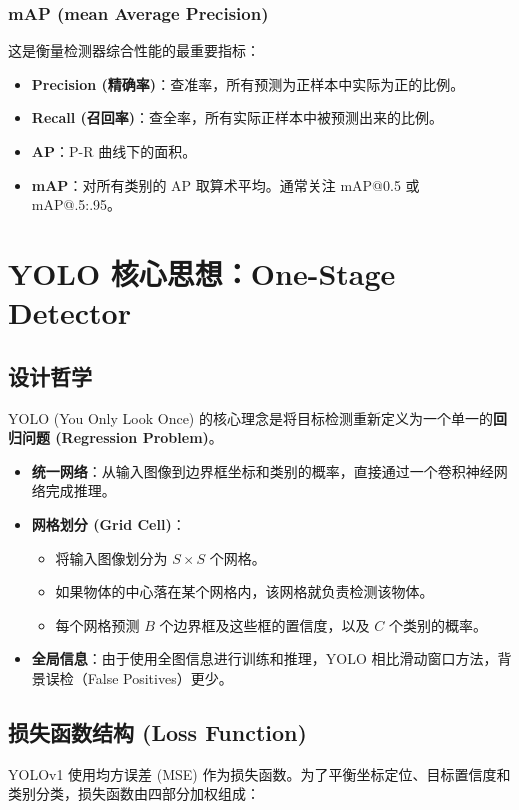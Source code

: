 \documentclass[11pt,a4paper]{article}
\begin{document}
\subsubsection{mAP (mean Average Precision)}
这是衡量检测器综合性能的最重要指标：
\begin{itemize}
    \item \textbf{Precision (精确率)}：查准率，所有预测为正样本中实际为正的比例。
    \item \textbf{Recall (召回率)}：查全率，所有实际正样本中被预测出来的比例。
    \item \textbf{AP}：P-R 曲线下的面积。
    \item \textbf{mAP}：对所有类别的 AP 取算术平均。通常关注 mAP@0.5 或 mAP@.5:.95。
\end{itemize}


\section{YOLO 核心思想：One-Stage Detector}

\subsection{设计哲学}
YOLO (You Only Look Once) 的核心理念是将目标检测重新定义为一个单一的\textbf{回归问题 (Regression Problem)}。
\begin{itemize}
    \item \textbf{统一网络}：从输入图像到边界框坐标和类别的概率，直接通过一个卷积神经网络完成推理。
    \item \textbf{网格划分 (Grid Cell)}：
    \begin{itemize}
        \item 将输入图像划分为 $S \times S$ 个网格。
        \item 如果物体的中心落在某个网格内，该网格就负责检测该物体。
        \item 每个网格预测 $B$ 个边界框及这些框的置信度，以及 $C$ 个类别的概率。
    \end{itemize}
    \item \textbf{全局信息}：由于使用全图信息进行训练和推理，YOLO 相比滑动窗口方法，背景误检（False Positives）更少。
\end{itemize}



\subsection{损失函数结构 (Loss Function)}
YOLOv1 使用均方误差 (MSE) 作为损失函数。为了平衡坐标定位、目标置信度和类别分类，损失函数由四部分加权组成：
\end{document}
